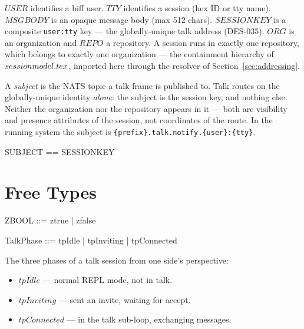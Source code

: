 \documentclass[a4paper,10pt,fleqn]{article}
\begin{document}
\begin{zed}
\end{zed}

\begin{zed}
\end{zed}

$USER$ identifies a biff user.  $TTY$ identifies a session (hex ID or
tty name).  $MSGBODY$ is an opaque message body (max 512 chars).
$SESSIONKEY$ is a composite \texttt{user:tty} key --- the globally-unique
talk address (DES-035).  $ORG$ is an organization and $REPO$ a
repository.  A session runs in exactly one repository, which belongs to
exactly one organization --- the containment hierarchy of
$session\-model.tex$, imported here through the resolver of
Section~\ref{sec:addressing}.

A \emph{subject} is the NATS topic a talk frame is published to.  Talk
routes on the globally-unique identity \emph{alone}: the subject is the
session key, and nothing else.  Neither the organization nor the
repository appears in it --- both are visibility and presence attributes
of the session, not coordinates of the route.  In the running system
the subject is \texttt{\{prefix\}.talk.notify.\{user\}:\{tty\}}.

\begin{zed}
  SUBJECT == SESSIONKEY
\end{zed}

\section{Free Types}

\begin{zed}
  ZBOOL ::= ztrue | zfalse
\end{zed}

\begin{zed}
  TalkPhase ::= tpIdle | tpInviting | tpConnected
\end{zed}

The three phases of a talk session from one side's perspective:
\begin{itemize}
\item $tpIdle$ --- normal REPL mode, not in talk.
\item $tpInviting$ --- sent an invite, waiting for accept.
\item $tpConnected$ --- in the talk sub-loop, exchanging messages.
\end{itemize}
\end{document}

